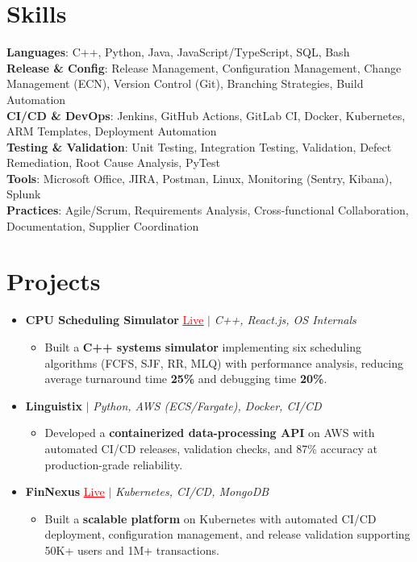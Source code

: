 \documentclass[letterpaper,10pt]{article}
\newcommand{\resumeItem}[1]{\item\small{{#1 \vspace{-2pt}}}}
\newcommand{\resumeProjectHeading}[1]{\item \small #1 \vspace{-2pt}}
\newcommand{\resumeSubHeadingListStart}{\begin{itemize}[leftmargin=0.0in, label={}]}
\newcommand{\resumeSubHeadingListEnd}{\end{itemize}}
\newcommand{\resumeProjItemListStart}{\begin{itemize}[leftmargin=0.15in,label=\textbullet,itemsep=0pt,topsep=0pt,parsep=0pt,partopsep=0pt]}
\newcommand{\resumeProjItemListEnd}{\end{itemize}\vspace{-4pt}}
\begin{document}
\section{Skills}
\begin{itemize}[leftmargin=0.15in, label={}]
\small{\item{
\textbf{Languages}: C++, Python, Java, JavaScript/TypeScript, SQL, Bash \\
\textbf{Release \& Config}: Release Management, Configuration Management, Change Management (ECN), Version Control (Git), Branching Strategies, Build Automation \\
\textbf{CI/CD \& DevOps}: Jenkins, GitHub Actions, GitLab CI, Docker, Kubernetes, ARM Templates, Deployment Automation \\
\textbf{Testing \& Validation}: Unit Testing, Integration Testing, Validation, Defect Remediation, Root Cause Analysis, PyTest \\
\textbf{Tools}: Microsoft Office, JIRA, Postman, Linux, Monitoring (Sentry, Kibana), Splunk \\
\textbf{Practices}: Agile/Scrum, Requirements Analysis, Cross-functional Collaboration, Documentation, Supplier Coordination
}}
\end{itemize}
\vspace{-6pt}
\section{Projects}
\resumeSubHeadingListStart
\vspace{-2pt}
\resumeProjectHeading{\textbf{CPU Scheduling Simulator} {\href{https://cpu-scheduler-amber.vercel.app/}{\textcolor{red}{\underline{Live}}}} $|$ \emph{C++, React.js, OS Internals}}
\resumeProjItemListStart
\resumeItem{Built a \textbf{C++ systems simulator} implementing six scheduling algorithms (FCFS, SJF, RR, MLQ) with performance analysis, reducing average turnaround time \textbf{25\%} and debugging time \textbf{20\%}.}
\resumeProjItemListEnd
\vspace{3pt}
\resumeProjectHeading{\textbf{Linguistix} $|$ \emph{Python, AWS (ECS/Fargate), Docker, CI/CD}}
\resumeProjItemListStart
\resumeItem{Developed a \textbf{containerized data-processing API} on AWS with automated CI/CD releases, validation checks, and 87\% accuracy at production-grade reliability.}
\resumeProjItemListEnd
\vspace{3pt}
\resumeProjectHeading{\textbf{FinNexus} {\href{https://fin-nexus.vercel.app/}{\textcolor{red}{\underline{Live}}}} $|$ \emph{Kubernetes, CI/CD, MongoDB}}
\resumeProjItemListStart
\resumeItem{Built a \textbf{scalable platform} on Kubernetes with automated CI/CD deployment, configuration management, and release validation supporting 50K+ users and 1M+ transactions.}
\resumeProjItemListEnd
\resumeSubHeadingListEnd
\end{document}
